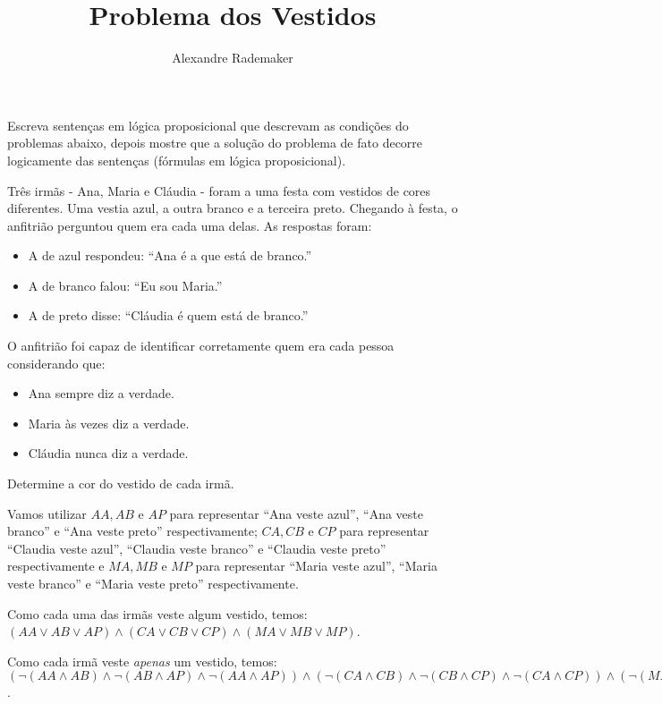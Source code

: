 \documentclass[answers]{exam}
\begin{document}
\title{Problema dos Vestidos}
\author{Alexandre Rademaker}
\maketitle

Escreva senten\c{c}as em l\'ogica proposicional que
 descrevam as condi\c{c}\~oes do problemas abaixo, depois
 mostre que a solu\c{c}\~ao do  problema de fato decorre
 logicamente das senten\c{c}as (f\'ormulas em l\'ogica proposicional).

 Tr\^es irm\~as - Ana, Maria e Cl\'audia - foram a uma festa
 com vestidos de cores diferentes.  Uma vestia azul, a outra branco e
 a terceira preto. Chegando \`a festa, o anfitri\~ao perguntou quem
 era cada uma delas.  As respostas foram:
\begin{itemize}
 \item A de azul respondeu: ``Ana \'e a que est\'a de branco.''
 \item A de branco falou: ``Eu sou Maria.''
 \item A de preto disse:  ``Cl\'audia \'e quem est\'a de branco.''
\end{itemize}
  O anfitri\~ao foi capaz de identificar corretamente quem era cada pessoa considerando que:
\begin{itemize}
 \item Ana sempre diz a verdade.
 \item Maria \`as vezes diz a verdade.
 \item Cl\'audia nunca diz a verdade.
\end{itemize}
Determine a cor do vestido de cada irm\~a.

  Vamos utilizar $AA, AB$ e $AP$ para representar ``Ana veste azul'',
  ``Ana veste branco'' e ``Ana veste preto'' respectivamente; $CA, CB$
  e $CP$ para representar ``Claudia veste azul'', ``Claudia veste
  branco'' e ``Claudia veste preto'' respectivamente e $MA, MB$ e $MP$
  para representar ``Maria veste azul'', ``Maria veste branco'' e
  ``Maria veste preto'' respectivamente.

  Como cada uma das irm\~as veste algum vestido, temos:
$(AA\lor AB\lor AP)\land(CA\lor CB\lor CP)\land(MA\lor MB\lor MP)$.

Como cada irm\~a veste \textit{apenas} um vestido, temos:
$(\neg (AA\land AB)\land \neg (AB\land AP) \land \neg (AA\land AP)) \land
(\neg (CA\land CB)\land \neg (CB\land CP) \land \neg (CA\land CP)) \land
(\neg (MA\land MB)\land \neg (MB\land MP) \land \neg (MA\land
MP))$.
\end{document}
